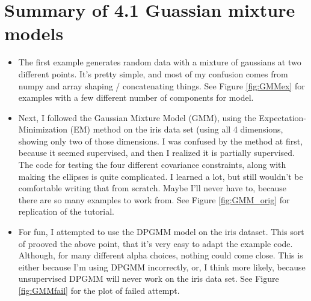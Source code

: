 \documentclass{article}
\begin{document}
	\section{Summary of 4.1 Guassian mixture models}

	\begin{itemize}
		\item The first example generates random data with a mixture of gaussians at two different points.  It's pretty simple, and most of my confusion comes from numpy and array shaping / concatenating things.  See Figure \ref{fig:GMMex} for examples with a few different number of components for model.
		\item Next, I followed the Gaussian Mixture Model (GMM), using the Expectation-Minimization (EM) method on the iris data set (using all 4 dimensions, showing only two of those dimensions.  I was confused by the method at first, because it seemed supervised, and then I realized it is partially supervised.  The code for testing the four different covariance constraints, along with making the ellipses is quite complicated.  I learned a lot, but still wouldn't be comfortable writing that from scratch.  Maybe I'll never have to, because there are so many examples to work from. See Figure \ref{fig:GMM_orig} for replication of the tutorial.
		\item For fun, I attempted to use the DPGMM model on the iris dataset.  This sort of prooved the above point, that it's very easy to adapt the example code.  Although, for many different alpha choices, nothing could come close.  This is either because I'm using DPGMM incorrectly, or, I think more likely, because unsupervised DPGMM will never work on the iris data set.  See Figure \ref{fig:GMMfail} for the plot of failed attempt.
	\end{itemize}
\end{document}
